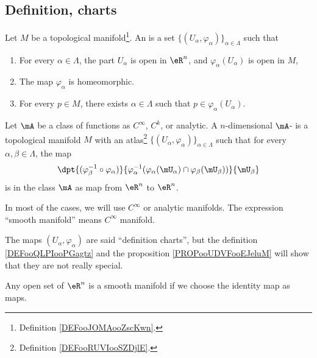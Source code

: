 \subsection{Definition, charts}

\begin{definition}		\label{DEFooRUVIooSZDjlE}
	Let \( M\) be a topological manifold\footnote{Definition \ref{DEFooJOMAooZscKwn}.}. An  is a set \( \{ (U_{\alpha}, \varphi_{\alpha})\}_{\alpha\in\Lambda}\) such that
	\begin{enumerate}
		\item
		      For every \( \alpha\in\Lambda\), the part \( U_{\alpha}\) is open in \( \eR^n\), and \( \varphi_{\alpha}(U_{\alpha})\) is open in \( M\),
		\item
		      The map \( \varphi_{\alpha}\) is homeomorphic.
		\item
		      For every \( p\in M\), there exists \( \alpha\in \Lambda\) such that \( p\in \varphi_{\alpha}(U_{\alpha})\).
	\end{enumerate}
\end{definition}

\begin{definition}		\label{DEFooVMWRooGQYJwl}
	Let \( \mA\) be a class of functions as \(  C^{\infty}\), \( C^k\), or analytic. A $n$-dimensional \( \mA\)- is a topological manifold \( M\) with an atlas\footnote{Definition \ref{DEFooRUVIooSZDjlE}.} \( \{ (U_{\alpha}, \varphi_{\alpha}) \}_{\alpha\in\Lambda}\) such that for every \( \alpha,\beta\in\Lambda\), the map
	\begin{equation}
		\dpt{  (\varphi_{\beta}^{-1}\circ\varphi_{\alpha})  }{   \varphi_{\alpha}^{-1}( \varphi_{\alpha}(\mU_{\alpha})\cap\varphi_{\beta}(\mU_{\beta})  )   }{\mU_{\beta}}
	\end{equation}
	is in the class \( \mA\) as map from $\eR^n$ to $\eR^n$.

	In most of the cases, we will use \(  C^{\infty}\) or analytic manifolds. The expression ``smooth manifold'' means \(  C^{\infty}\) manifold.

	The maps \( (U_{\alpha}, \varphi_{\alpha})\) are said ``definition charts'', but the definition \ref{DEFooQLPIooPGagtz} and the proposition \ref{PROPooUDVFooEJeluM} will show that they are not really special.
\end{definition}

\begin{example}
	Any open set of $\eR^n$ is a smooth manifold if we choose the identity map as maps.
\end{example}

